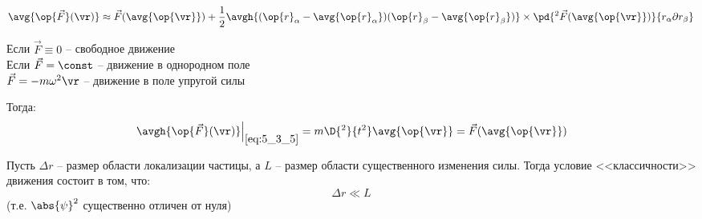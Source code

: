 \begin{equation}
\label{eq:5_3_8}
\avg{\op{\vec{F}}(\vr)} \approx \vec{F}(\avg{\op{\vr}}) + \frac{1}{2} \avgh{(\op{r}_\alpha - \avg{\op{r}_\alpha})(\op{r}_\beta - \avg{\op{r}_\beta})} \times \pd{^2 \vec{F}(\avg{\op{\vr}})}{r_\alpha \partial r_\beta}
\end{equation}

\noindent
Если $\vec{F} \equiv 0$ -- свободное движение\\
Если $\vec{F} = \const$ -- движение в однородном поле\\
$\vec{F} = - m\omega^2 \vr$ -- движение в поле упругой силы

Тогда:
\begin{equation}
\label{eq:5_3_9}
\left. \avgh{\op{\vec{F}}(\vr)} \right|_{\eqref{eq:5_3_5}} = m \D{^2}{t^2} \avg{\op{\vr}} = \vec{F}(\avg{\op{\vr}})
\end{equation}

Пусть $\Delta r$ -- размер области локализации частицы, а $L$ -- размер области существенного изменения силы. Тогда условие <<классичности>> движения состоит в том, что:
\begin{equation}
\label{eq:5_3_10}
\Delta r \ll L
\end{equation}
(т.е. $\abs{\psi}^2$ существенно отличен от нуля)